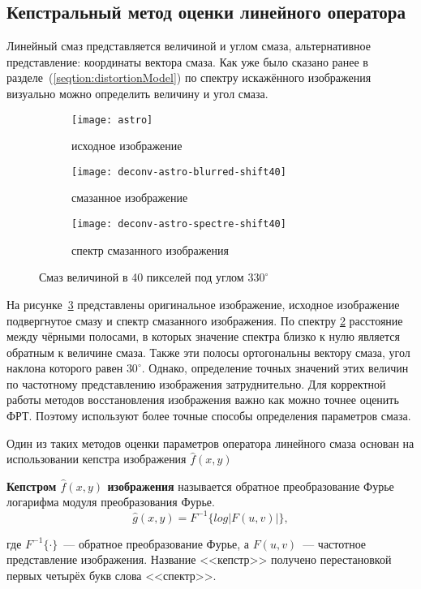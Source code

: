 \subsection{Кепстральный метод оценки линейного оператора}
Линейный смаз представляется величиной и углом смаза, альтернативное представление: координаты вектора смаза. 
Как уже было сказано ранее в разделе~(\ref{seqtion:distortionModel}) по спектру искажённого изображения визуально можно определить величину и угол смаза.
\begin{figure}[h!]
	\begin{subfigure}[t]{0.3\textwidth}
		\texttt{[image: astro]}
		\caption{исходное изображение}
	\end{subfigure}%
	\begin{subfigure}[t]{0.3\textwidth}
		\texttt{[image: deconv-astro-blurred-shift40]}
		\caption{смазанное изображение}
		\label{fig:astroShift40}
	\end{subfigure}%
	\begin{subfigure}[t]{0.3\textwidth}
		\texttt{[image: deconv-astro-spectre-shift40]}
		\caption{спектр смазанного изображения}
		\label{fig:astroShift40Spectre}
	\end{subfigure}
	\caption{Смаз величиной в 40 пикселей под углом $330^{\circ}$}
	\label{fig:spectre}
\end{figure}
На рисунке~\ref{fig:spectre} представлены оригинальное изображение, исходное изображение подвергнутое смазу и спектр смазанного изображения. По спектру \ref{fig:astroShift40Spectre} расстояние между чёрными полосами, в которых значение спектра близко к нулю является обратным к величине смаза. Также эти полосы ортогональны вектору смаза, угол наклона которого равен $30^\circ$. Однако, определение точных значений этих величин по частотному представлению изображения затруднительно. Для корректной работы методов восстановления изображения важно как можно точнее оценить ФРТ. Поэтому используют более точные способы определения параметров смаза.

Один из таких методов оценки параметров оператора линейного смаза основан на использовании кепстра изображения $\hat{f}(x,y)$~\cite{iterableImageRestorationBiemonLangdeik}
\begin{definition}\label{def:kepstr}
	\textbf{Кепстром $\hat{f}(x,y)$ изображения} называется обратное преобразование Фурье логарифма модуля преобразования Фурье.
	\begin{equation}
	\hat{g}(x,y) = F^{-1}\{log|F(u,v)|\},
	\end{equation}
\end{definition}
где $F^{-1}\{\cdot\}$~--- обратное преобразование Фурье, а $F(u,v)$~--- частотное представление изображения. Название <<кепстр>> получено перестановкой первых четырёх букв слова <<спектр>>.

